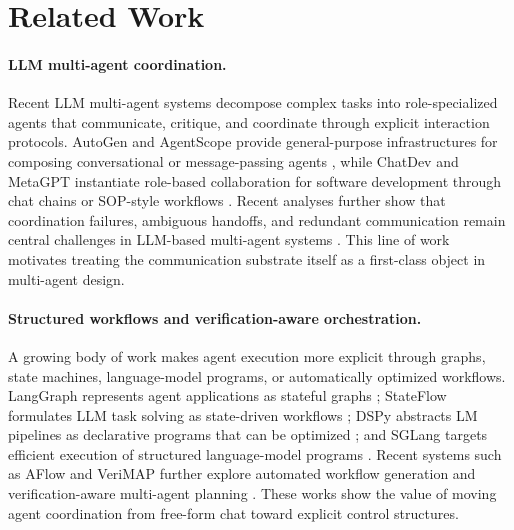 \documentclass[11pt]{article}
\newcommand{\method}{PatchBoard}
\begin{document}

\section{Related Work}

\paragraph{LLM multi-agent coordination.}
Recent LLM multi-agent systems decompose complex tasks into role-specialized agents that communicate, critique, and coordinate through explicit interaction protocols. AutoGen and AgentScope provide general-purpose infrastructures for composing conversational or message-passing agents \citep{wu2024autogen,agentscope}, while ChatDev and MetaGPT instantiate role-based collaboration for software development through chat chains or SOP-style workflows \citep{qian-etal-2024-chatdev,hong2024metagpt}. Recent analyses further show that coordination failures, ambiguous handoffs, and redundant communication remain central challenges in LLM-based multi-agent systems \citep{cemri2025why}. This line of work motivates treating the communication substrate itself as a first-class object in multi-agent design.

\paragraph{Structured workflows and verification-aware orchestration.}
A growing body of work makes agent execution more explicit through graphs, state machines, language-model programs, or automatically optimized workflows. LangGraph represents agent applications as stateful graphs \citep{langgraph2024}; StateFlow formulates LLM task solving as state-driven workflows \citep{wu2024stateflow}; DSPy abstracts LM pipelines as declarative programs that can be optimized \citep{khattab2024dspy}; and SGLang targets efficient execution of structured language-model programs \citep{zheng2024sglang}. Recent systems such as AFlow and VeriMAP further explore automated workflow generation and verification-aware multi-agent planning \citep{zhang2024aflow,xu2026verification}. These works show the value of moving agent coordination from free-form chat toward explicit control structures.
\end{document}
